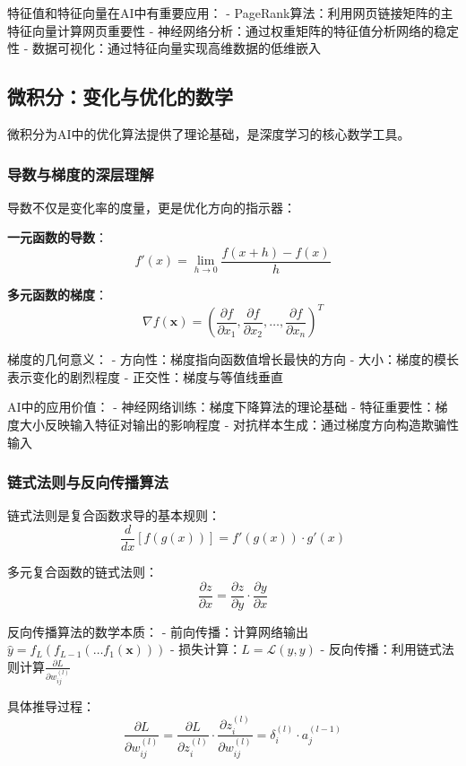 特征值和特征向量在AI中有重要应用：
- PageRank算法：利用网页链接矩阵的主特征向量计算网页重要性
- 神经网络分析：通过权重矩阵的特征值分析网络的稳定性
- 数据可视化：通过特征向量实现高维数据的低维嵌入

\subsection{微积分：变化与优化的数学}

微积分为AI中的优化算法提供了理论基础，是深度学习的核心数学工具。

\subsubsection{导数与梯度的深层理解}

导数不仅是变化率的度量，更是优化方向的指示器：

\textbf{一元函数的导数}：
$$f'(x) = \lim_{h \to 0} \frac{f(x+h) - f(x)}{h}$$

\textbf{多元函数的梯度}：
$$\nabla f(\mathbf{x}) = \left(\frac{\partial f}{\partial x_1}, \frac{\partial f}{\partial x_2}, \ldots, \frac{\partial f}{\partial x_n}\right)^T$$

梯度的几何意义：
- 方向性：梯度指向函数值增长最快的方向
- 大小：梯度的模长表示变化的剧烈程度
- 正交性：梯度与等值线垂直

AI中的应用价值：
- 神经网络训练：梯度下降算法的理论基础
- 特征重要性：梯度大小反映输入特征对输出的影响程度
- 对抗样本生成：通过梯度方向构造欺骗性输入

\subsubsection{链式法则与反向传播算法}

链式法则是复合函数求导的基本规则：
$$\frac{d}{dx}[f(g(x))] = f'(g(x)) \cdot g'(x)$$

多元复合函数的链式法则：
$$\frac{\partial z}{\partial x} = \frac{\partial z}{\partial y} \cdot \frac{\partial y}{\partial x}$$

反向传播算法的数学本质：
- 前向传播：计算网络输出$\hat{y} = f_L(f_{L-1}(\ldots f_1(\mathbf{x})))$
- 损失计算：$L = \mathcal{L}(\hat{y}, y)$
- 反向传播：利用链式法则计算$\frac{\partial L}{\partial w_{ij}^{(l)}}$

具体推导过程：
$$\frac{\partial L}{\partial w_{ij}^{(l)}} = \frac{\partial L}{\partial z_i^{(l)}} \cdot \frac{\partial z_i^{(l)}}{\partial w_{ij}^{(l)}} = \delta_i^{(l)} \cdot a_j^{(l-1)}$$


